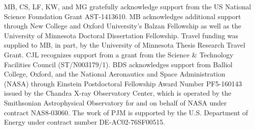 MB, CS, LF, KW, and MG gratefully acknowledge support from the US National Science
Foundation Grant AST-1413610.  MB acknowledges additional support 
through New College and Oxford University's Balzan Fellowship as well as the University
of Minnesota Doctoral Dissertation Fellowship. Travel funding was supplied 
to MB, in part, by the University of Minnesota Thesis Research Travel Grant. CJL recognizes support from a grant from the Science \& Technology Facilities Council (ST/N003179/1). 
BDS acknowledges support from Balliol College, Oxford, and the National Aeronautics and Space Administration (NASA) through Einstein Postdoctoral Fellowship Award Number PF5-160143 issued by the Chandra X-ray Observatory Center, which is operated by the Smithsonian Astrophysical Observatory for and on behalf of NASA under contract NAS8-03060. The work of PJM is supported by the U.S. Department of Energy under contract number DE-AC02-76SF00515.

